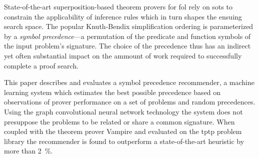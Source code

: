 


State-of-the-art superposition-based theorem provers for \acrlong{fol} %
rely on \glspl{sot} to constrain the applicability of inference rules 
which in turn shapes the ensuing search space.
The popular Knuth-Bendix simplification ordering is parameterized by 
a \emph{symbol precedence}---a permutation of the predicate and function symbols
of the input problem's signature.
The choice of the precedence thus has an indirect yet often substantial impact 
on the ammount of work required to successfully complete a proof search.


This paper describes and evaluates a symbol precedence recommender,
a machine learning system which estimates the best possible precedence
based on observations of prover performance on a set of problems and random precedences.
Using the graph convolutional neural network technology %
the system does not presuppose the problems to be related or share a common signature. 
When coupled with the theorem prover Vampire and evaluated on the \acrshort{tptp} problem library
the recommender is found to outperform a state-of-the-art heuristic by more than \SI{2}{\percent}.


